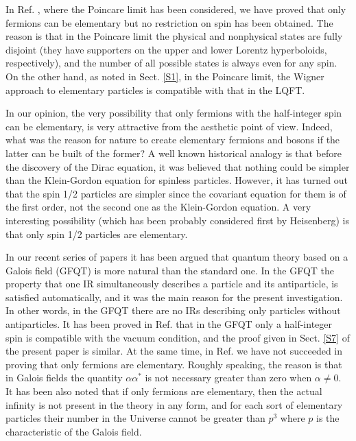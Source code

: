 \documentclass[a4paper,12pt]{article}%
\begin{document}
In Ref. \cite{hep}, where the Poincare limit has been
considered, we have proved that only fermions can be
elementary but no restriction on spin has been 
obtained. The reason is that in the Poincare limit
the physical and nonphysical states are fully disjoint
(they have supporters on the upper and lower Lorentz
hyperboloids, respectively), and the number of all
possible states is always even for any spin. On the other
hand, as noted in Sect. \ref{S1}, in the Poincare limit,
the Wigner approach to elementary particles is
compatible with that in the LQFT.
 
In our opinion, the very possibility that only fermions 
with the half-integer spin can be elementary, is very 
attractive from the
aesthetic point of view. Indeed, what was the reason for
nature to create elementary fermions and bosons if the 
latter can be built of the former? A well known
historical analogy is that before the discovery of
the Dirac equation, it was believed that nothing could
be simpler than the Klein-Gordon equation for spinless
particles. However, it has turned out that the spin 1/2
particles are simpler since the covariant equation
for them is of the first order, not the second one as the
Klein-Gordon equation. A very interesting possibility
(which has been probably considered first by Heisenberg) is 
that only spin 1/2 particles are elementary.

In our recent series of papers \cite{lev2} 
it has been argued that quantum
theory based on a Galois field (GFQT) is more natural
than the standard one. In the GFQT the property that
one IR simultaneously describes a particle and its
antiparticle, is satisfied automatically, and it was
the main reason for the present investigation. In other
words, in the GFQT there are no IRs describing only 
particles without antiparticles. It has been proved
in Ref. \cite{lev2} that in the GFQT only a half-integer
spin is compatible with the vacuum condition, and the
proof given in Sect. \ref{S7} of the present paper is
similar. At the same time, in Ref. \cite{lev2} we have 
not succeeded in proving that only fermions are 
elementary. Roughly speaking, the reason is that in 
Galois fields the quantity $\alpha \alpha^*$ is not 
necessary greater than zero when $\alpha \neq 0$.
It has been also noted that if only fermions are 
elementary, then the actual infinity is not present in the
theory in any form, and for each sort of elementary
particles their number in the Universe cannot be 
greater than $p^3$ where $p$ is the characteristic
of the Galois field.
\end{document}
